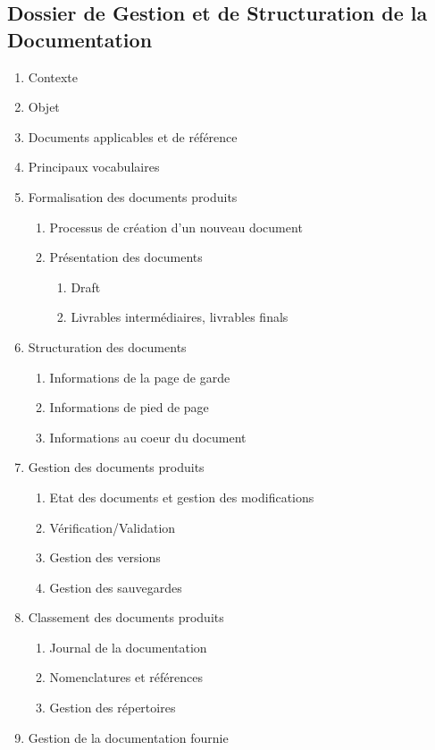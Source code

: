 \subsection{Dossier de Gestion et de Structuration de la Documentation}
\begin{enumerate}
\item Contexte
\item Objet
\item Documents applicables et de référence
\item Principaux vocabulaires
\item Formalisation des documents produits
\begin{enumerate}
\item Processus de création d'un nouveau document
\item Présentation des documents
\begin{enumerate}
\item Draft
\item Livrables intermédiaires, livrables finals
\end{enumerate}
\end{enumerate}
\item Structuration des documents
\begin{enumerate}
\item Informations de la page de garde
\item Informations de pied de page
\item Informations au coeur du document
\end{enumerate}
\item Gestion des documents produits
\begin{enumerate}
\item Etat des documents et gestion des modifications
\item Vérification/Validation
\item Gestion des versions
\item Gestion des sauvegardes
\end{enumerate}
\item Classement des documents produits
\begin{enumerate}
\item Journal de la documentation
\item Nomenclatures et références
\item Gestion des répertoires
\end{enumerate}
\item Gestion de la documentation fournie
\begin{enumerate}

\end{enumerate}
\end{enumerate}
